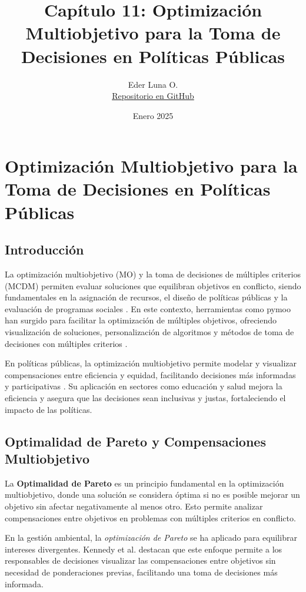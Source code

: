 \documentclass[12pt]{article}
\title{\textbf{Capítulo 11: Optimización Multiobjetivo para la Toma de Decisiones en Políticas Públicas}}
\author{Eder Luna O. \\ \href{https://github.com/Ederluna-3/MetodosdeOptimizacion/tree/main/LIBRO_CAPITULO_11}{Repositorio en GitHub}}
\date{Enero 2025}
\begin{document}
\maketitle
\newpage

\section{\LARGE \bfseries Optimización Multiobjetivo para la Toma de Decisiones en Políticas Públicas}

\subsection*{Introducción}

La optimización multiobjetivo (MO) y la toma de decisiones de múltiples criterios (MCDM) permiten evaluar soluciones que equilibran objetivos en conflicto, siendo fundamentales en la asignación de recursos, el diseño de políticas públicas y la evaluación de programas sociales \cite{Sengupta2016}. En este contexto, herramientas como pymoo han surgido para facilitar la optimización de múltiples objetivos, ofreciendo visualización de soluciones, personalización de algoritmos y métodos de toma de decisiones con múltiples criterios \cite{Blank2020}.  

En políticas públicas, la optimización multiobjetivo permite modelar y visualizar compensaciones entre eficiencia y equidad, facilitando decisiones más informadas y participativas \cite{Papalexopoulos2022}. Su aplicación en sectores como educación y salud mejora la eficiencia y asegura que las decisiones sean inclusivas y justas, fortaleciendo el impacto de las políticas.

\subsection{Optimalidad de Pareto y Compensaciones Multiobjetivo}

La \textbf{Optimalidad de Pareto} es un principio fundamental en la optimización multiobjetivo, donde una solución se considera óptima si no es posible mejorar un objetivo sin afectar negativamente al menos otro. Esto permite analizar compensaciones entre objetivos en problemas con múltiples criterios en conflicto.  

En la gestión ambiental, la \textit{optimización de Pareto} se ha aplicado para equilibrar intereses divergentes. Kennedy et al. \cite{Kennedy2008} destacan que este enfoque permite a los responsables de decisiones visualizar las compensaciones entre objetivos sin necesidad de ponderaciones previas, facilitando una toma de decisiones más informada.  
\end{document}
